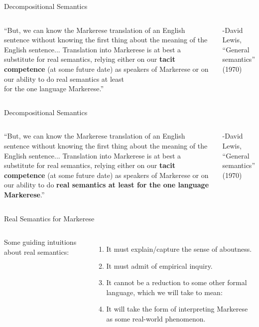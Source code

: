 \documentclass{beamer}
\begin{document}
\begin{frame}{Decompositional Semantics}
\begin{columns}
``But, we can know the Markerese translation of an English sentence without knowing the first thing about the meaning of the English sentence... Translation into Markerese is at best a substitute for real semantics, relying either on our {\bf tacit competence} (at some future date) as speakers of Markerese or on our ability to do real semantics at least \\ for the one language Markerese.''
\par\vspace{.25in}
\hfill -David Lewis, ``General semantics'' (1970)
\end{columns}
\end{frame}

\begin{frame}{Decompositional Semantics}
\begin{columns}
``But, we can know the Markerese translation of an English sentence without knowing the first thing about the meaning of the English sentence... Translation into Markerese is at best a substitute for real semantics, relying either on our {\bf tacit competence} (at some future date) as speakers of Markerese or on our ability to do {\bf real semantics at least for the one language Markerese}.''
\par\vspace{.25in}
\hfill -David Lewis, ``General semantics'' (1970)
\end{columns}
\end{frame}

\begin{frame}{Real Semantics for Markerese}
\begin{columns}
Some guiding intuitions about real semantics:
\par\vspace{.125in}
\begin{enumerate}
\item It must explain/capture the sense of aboutness.
\vspace{.125in}
\item It must admit of empirical inquiry.
\vspace{.125in}
\item It cannot be a reduction to some other formal language, which we will take to mean:
\vspace{.125in}
\item It will take the form of interpreting Markerese as some real-world phenomenon.
\end{enumerate}
\end{columns}
\end{frame}
\end{document}
